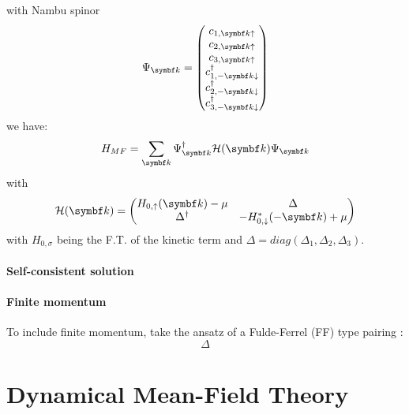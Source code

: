 \documentclass[../notes.tex]{subfiles}
\begin{document}
with Nambu spinor
\begin{equation}
	\Psi_{\vb{k}} =
	\begin{pmatrix}
		c_{1, \vb{k} \uparrow} \\
		c_{2, \vb{k} \uparrow} \\
		c_{3, \vb{k} \uparrow} \\
		c_{1, -\vb{k} \downarrow}^{\dagger} \\
		c_{2, -\vb{k} \downarrow}^{\dagger} \\
		c_{3, -\vb{k} \downarrow}^{\dagger} \\
	\end{pmatrix}
\end{equation}
we have:
\begin{equation}
	H_{MF} = \sum_{\vb{k}} \Psi_{\vb{k}}^{\dagger} \mathcal{H} (\vb{k}) \Psi_{\vb{k}}
\end{equation}
with
\begin{equation}
	\mathcal{H} (\vb{k}) =
	\begin{pmatrix}
		H_{0, \uparrow} (\vb{k}) - \mu & \Delta \\
		\Delta^{\dagger} & - H_{0, \downarrow}^* (-\vb{k}) + \mu
	\end{pmatrix}
\end{equation}
with \(H_{0, \sigma}\) being the F.T. of the kinetic term and \(\Delta = diag(\Delta_1, \Delta_2, \Delta_3)\).




\paragraph{Self-consistent solution}


\paragraph{Finite momentum}

To include finite momentum, take the ansatz of a Fulde-Ferrel (FF) type pairing \cite{kinnunenFuldeFerrellLarkin2018}:
\begin{equation}
	\Delta
\end{equation}


\section{Dynamical Mean-Field Theory}
\end{document}
